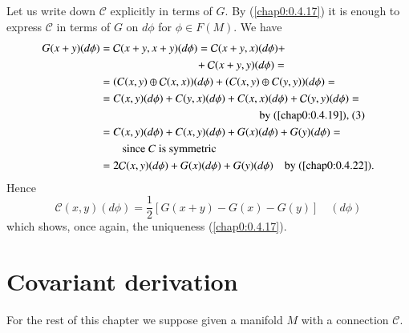 \subsection{}\label{chap2:2.2.4}

\begin{remark*}
Let us write down $\mathcal{C}$ explicitly in terms of $G$. By
(\ref{chap0:0.4.17}) it is enough to express $\mathcal{C}$ in terms of
$G$ on $d\phi$ for $\phi\in F(M)$. We have
\begin{align*}
G(x+y)(d\phi) &=
\mathcal{C}(x+y,x+y)(d\phi)=\mathcal{C}(x+y,x)(d\phi)+\\
&\hspace{3cm} +\mathcal{C}(x+y,y)(d\phi)=\\
&=(C(x,y)\oplus\mathcal{C}(x,x))(d\phi)+(C(x,y)\oplus C(y,y))(d\phi)=\\
&=C(x,y)(d\phi)+C(y,x)(d\phi)+C(x,x)(d\phi)+\mathcal{C}(y,y)(d\phi)=\\
&\hspace{5cm} \text{by (\ref{chap0:0.4.19}), (3)}\\
&= C(x,y)(d\phi)+C(x,y)(d\phi)+G(x)(d\phi)+G(y)(d\phi)=\\
&\qquad \text{since $C$ is symmetric}\\
&= 2\mathcal{C}(x,y)(d\phi)+G(x)(d\phi)+G(y)(d\phi)\quad\text{by
  (\ref{chap0:0.4.22}).} 
\end{align*}
Hence \pageoriginale
\begin{equation*}
\mathcal{C}(x,y)(d\phi)=\frac{1}{2}\left[G(x+y)-G(x)-G(y)\right]\quad
(d\phi) \tag{2.2.5}\label{chap2:2.2.5}
\end{equation*}
which shows, once again, the uniqueness (\ref{chap0:0.4.17}).
\end{remark*}

\section{Covariant derivation}\label{chap2:sec3}

\quad For the rest of this chapter we suppose given a manifold $M$
with a connection $\mathcal{C}$. 

\subsection{}\label{chap2:2.3.1}

